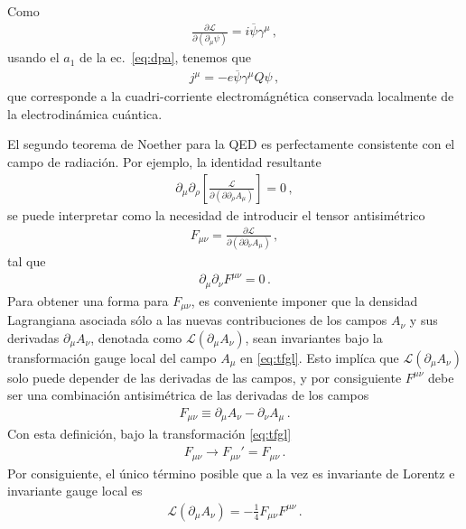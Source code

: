 \begin{frame}
Como
\begin{align}
\frac{\partial\mathcal{L}}{\partial\left(\partial_\mu\psi\right)}=i\overline{\psi}\gamma^{\mu}\,,
\end{align}
usando el $a_1$ de la ec.~\eqref{eq:dpa}, tenemos que
\begin{align}
  j^{\mu}=-e\overline{\psi}\gamma^{\mu} Q \psi\,,
\end{align}
que corresponde a la cuadri-corriente electromágnética conservada localmente de la electrodinámica cuántica.



El segundo teorema de Noether para la QED es perfectamente consistente con el campo de radiación. Por ejemplo,
la identidad resultante
\begin{align}
   \partial_{\mu} \partial_{\rho}\left[ \frac{ \mathcal{L}}{\partial \left(\partial  \partial_{\rho} A_{\mu}\right)}  \right]=0\,,
\end{align}
se puede interpretar como la necesidad de introducir el tensor antisimétrico
\begin{align}
  F_{\mu\nu}=\frac{\partial \mathcal{L}}{\partial \left(\partial  \partial_{\nu} A_{\mu}\right)}\,,
\end{align}
tal que
\begin{align}
  \partial_{\mu}\partial_{\nu}F^{\mu\nu}=0\,.
\end{align}
Para obtener una forma para $F_{\mu\nu}$, es conveniente imponer que la densidad Lagrangiana asociada sólo a las nuevas contribuciones de los campos $A_{\nu}$ y sus derivadas $\partial_{\mu}A_{\nu}$, denotada como $\mathcal{L}\left( \partial_{\mu}A_{\nu}\right)$,
sean invariantes  bajo la transformación gauge local  del campo $A_{\mu}$ en \eqref{eq:tfgl}. Esto implíca que $\mathcal{L}\left( \partial_{\mu}A_{\nu}\right)$  solo puede depender de las derivadas de las campos, y por consiguiente $F^{\mu\nu}$ debe ser una combinación antisimétrica de las derivadas de los campos
\begin{align}
  F_{\mu\nu}\equiv\partial_{\mu}A_{\nu}-\partial_{\nu}A_{\mu}\,.
\end{align}
Con esta definición, bajo la transformación  \eqref{eq:tfgl}
\begin{align}
  F_{\mu\nu}\to F_{\mu\nu}'=F_{\mu\nu}\,.
\end{align}
Por consiguiente, el único término posible que a la vez es invariante de Lorentz e invariante gauge local es
\begin{align}
 \mathcal{L}\left( \partial_{\mu}A_{\nu}\right)=-\frac{1}{4}F_{\mu\nu}F^{\mu\nu}\,.
\end{align}



\end{frame}
